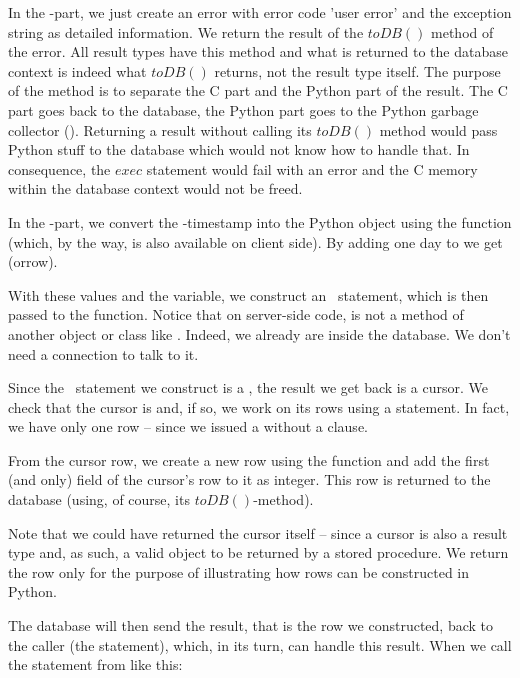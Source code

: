 In the -part, we just create
an error with error code 'user error' and
the exception string as detailed information.
We return the result of the $toDB()$
method of the error. All result types have this
method and what is returned to the database context
is indeed what $toDB()$ returns, not the result
type itself.
The purpose of the method is to separate
the C part and the Python part of the result.
The C part goes back to the database,
the Python part goes to the
Python garbage collector ().
Returning a result without calling its $toDB()$
method would pass Python stuff
to the database which would not know how to handle
that. In consequence, the $exec$ statement
would fail with an error
and the C memory within the database context
would not be freed.

In the -part,
we convert the \nowdb-timestamp
into the Python  object 
using the  function
(which, by the way,
is also available on client side).
By adding one day to  we get
(orrow).

With these values and the 
variable, we construct an \sql\ statement,
which is then passed to the 
function. Notice that on server-side code,
 is not a method of another
object or class like .
Indeed, we already are inside the database.
We don't need a connection to talk to it.

Since the \sql\ statement we construct
is a , the result we get
back is a cursor. We check that the cursor
is  and, if so, we work on
its rows using a  statement.
In fact, we have only
one row -- since we issued a 
without a  clause.

From the cursor row, we create a new row
using the  function
and add the first (and only) field 
of the cursor's row to it as integer. This row
is returned to the database (using,
of course, its $toDB()$-method).

Note that we could have returned the cursor itself --
since a cursor is also a result type and, as such,
a valid object to be returned by a stored procedure.
We return the row only for the purpose of illustrating
how rows can be constructed in Python.

The database will then send the result,
that is the row we constructed,
back to the caller (the  statement),
which, in its turn, can handle this result.
When we call the  statement
from  like this:

